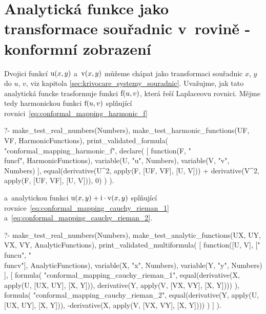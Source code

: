 

\section{Analytická funkce jako transformace souřadnic v~rovině - konformní zobrazení}

Dvojici funkcí \(\mathrm{u}(x, y)\) a~\(\mathrm{v}(x, y)\) můžeme chápat jako transformaci souřadnic \(x\), \(y\) do \(u\), \(v\), viz kapitola \ref{sec:krivocare_systemy_souradnic}. Uvažujme, jak tato analytická funcke trasformuje funkci \(\mathrm{f}(u, v)\), která řeší Laplaceovu rovnici. Mějme tedy harmonickou funkci \(\mathrm{f}(u, v)\) splňující rovnici~\eqref{eq:conformal_mapping_harmonic_f}

\begin{prolog}
?-	make_test_real_numbers(Numbers),
	make_test_harmonic_functions(UF, VF, HarmonicFunctions),
	print_validated_formula(
		"conformal_mapping_harmonic_f",
		declare(
			[
				function(F, "\\func{f}", HarmonicFunctions),
				variable(U, "u", Numbers),
				variable(V, "v", Numbers)
			],
			equal(derivative(U^2, apply(F, [UF, VF], [U, V])) + derivative(V^2, apply(F, [UF, VF], [U, V])), 0)
		)
	).
\end{prolog}

a~analytickou funkci \(\mathrm{u}(x, y) + \mathrm{i} \cdot \mathrm{v}(x, y)\) splňující rovnice~\eqref{eq:conformal_mapping_cauchy_rieman_1} a~\eqref{eq:conformal_mapping_cauchy_rieman_2}.

\begin{prolog}
?-	make_test_real_numbers(Numbers),
	make_test_analytic_functions(UX, UY, VX, VY, AnalyticFunctions),
	print_validated_multiformula(
		[
			function([U, V], ["\\func{u}", "\\func{v}"], AnalyticFunctions),
			variable(X, "x", Numbers),
			variable(Y, "y", Numbers)
		],
		[
			formula(
				"conformal_mapping_cauchy_rieman_1",
				equal(derivative(X, apply(U, [UX, UY], [X, Y])), derivative(Y, apply(V, [VX, VY], [X, Y])))
			),
			formula(
				"conformal_mapping_cauchy_rieman_2",
				equal(derivative(Y, apply(U, [UX, UY], [X, Y])), -derivative(X, apply(V, [VX, VY], [X, Y])))
			)
		]
	).
\end{prolog}

